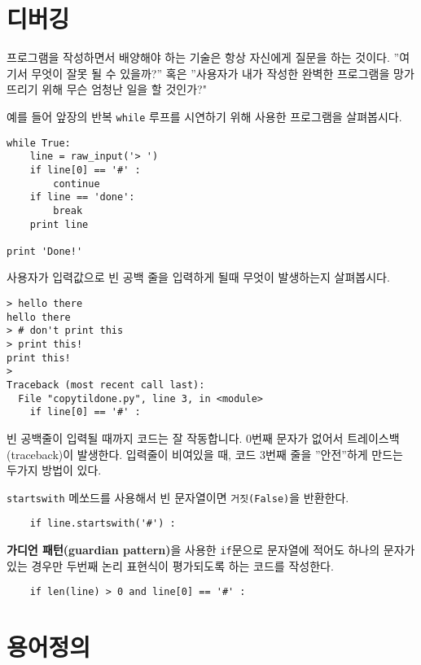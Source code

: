 \section{디버깅}

프로그램을 작성하면서 배양해야 하는 기술은 항상 자신에게 질문을 하는 것이다.
''여기서 무엇이 잘못 될 수 있을까?'' 혹은 ''사용자가 내가 작성한 완벽한 프로그램을 망가뜨리기 위해 무슨 엄청난 일을 할 것인가?"

예를 들어 앞장의 반복 {\tt while} 루프를 시연하기 위해 사용한 프로그램을 살펴봅시다.

\beforeverb
\begin{verbatim}
while True:
    line = raw_input('> ')
    if line[0] == '#' :
        continue
    if line == 'done':
        break
    print line

print 'Done!'
\end{verbatim}
\afterverb
%

사용자가 입력값으로 빈 공백 줄을 입력하게 될때 무엇이 발생하는지 살펴봅시다.

\beforeverb
\begin{verbatim}
> hello there
hello there
> # don't print this
> print this!
print this!
> 
Traceback (most recent call last):
  File "copytildone.py", line 3, in <module>
    if line[0] == '#' :
\end{verbatim}
\afterverb
%
빈 공백줄이 입력될 때까지 코드는 잘 작동합니다. 
0번째 문자가 없어서 트레이스백(traceback)이 발생한다. 입력줄이 비여있을 때, 코드 3번째 줄을 ''안전''하게 만드는 두가지 방법이 있다.

{\tt startswith} 메쏘드를 사용해서 빈 문자열이면  {\tt 거짓(False)}을 반환한다.

\beforeverb
\begin{verbatim}
    if line.startswith('#') :
\end{verbatim}
\afterverb
%

{\bf 가디언 패턴(guardian pattern)}을 사용한 {\tt if}문으로 문자열에 적어도 하나의 문자가 있는 경우만 두번째 논리 표현식이 평가되도록 하는 코드를 작성한다.

\beforeverb
\begin{verbatim}
    if len(line) > 0 and line[0] == '#' :
\end{verbatim}
\afterverb
%

\section{용어정의}

